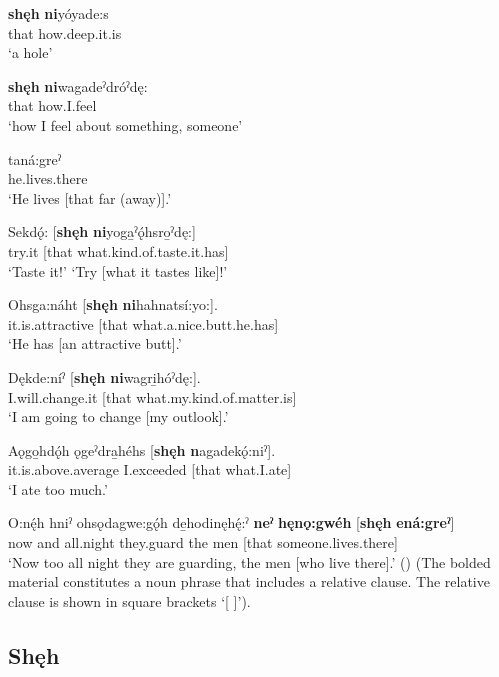 \ea
\label{ex:spart18}
\gll \textbf{shęh} \textbf{ni}yóyade:s\\
that how.deep.it.is\\
\glt ‘a hole’
\z

\ea
\label{ex:spart19}
\gll \textbf{shęh} \textbf{ni}wagadeˀdróˀdę:\\
that how.I.feel\\
\glt ‘how I feel about something, someone’
\z

\ea
\label{ex:spart20}
 taná:greˀ\\
[that it.is.a.certain.distance] he.lives.there\\
\glt ‘He lives [that far (away)].’
\z

\ea
\label{ex:spart21}
\gll Sekdǫ́: [\textbf{shęh} \textbf{ni}yoga̱ˀǫ́hsro̱ˀdę:]\\
try.it [that what.kind.of.taste.it.has]\\
\glt ‘Taste it!’ ‘Try [what it tastes like]!’
\z

\ea
\label{ex:spart22}
\gll Ohsga:náht [\textbf{shęh} \textbf{ni}hahnatsí:yo:].\\
it.is.attractive [that what.a.nice.butt.he.has]\\
\glt ‘He has [an attractive butt].’
\z

\ea
\label{ex:spart23}
\gll Dękde:níˀ [\textbf{shęh} \textbf{ni}wagri̱hóˀdę:].\\
I.will.change.it [that what.my.kind.of.matter.is]\\
\glt ‘I am going to change [my outlook].’
 \z

\ea
\label{ex:spart24}
\gll Aǫgo̱hdǫ́h ǫgeˀdra̱héhs [\textbf{shęh} \textbf{n}agadekǫ́:niˀ].\\
it.is.above.average I.exceeded [that what.I.ate]\\
\glt ‘I ate too much.’
\z

\ea
\label{ex:spart25}
\gll O:nę́h hniˀ ohsǫdagwe:gǫ́h de̱hodinęhę́:ˀ \textbf{neˀ} \textbf{hęnǫ:gwéh} [\textbf{shęh} \textbf{ená:greˀ}]\\
now and all.night they.guard the men [that someone.lives.there]\\
\glt ‘Now too all night they are guarding, the men [who live there].’ (\cite{keye_hnyagwaidatgigowah_2012}) (The bolded material constitutes a noun phrase that includes a relative clause. The relative clause is shown in square brackets `[ ]’).
\z


\subsection*{\textbf{Shęh} } \label{p:[shęh] `because’}

